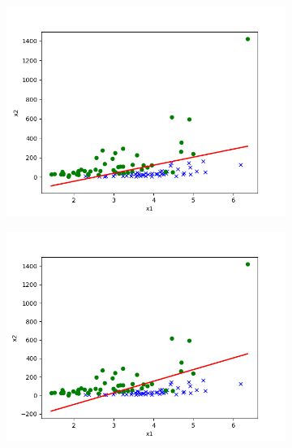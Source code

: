 \begin{answer}
\begin{figure}[htbp]
    \begin{subfigure}[b]{0.5\linewidth}
        \centering
        \includegraphics[width=\linewidth]{tex/p01b_pred_1.txt.png}
    \end{subfigure}
    \begin{subfigure}[b]{0.5\linewidth}
        \centering
        \includegraphics[width=\linewidth]{tex/p01e_pred_1.txt.png}
    \end{subfigure}

\end{figure}
\end{answer}
